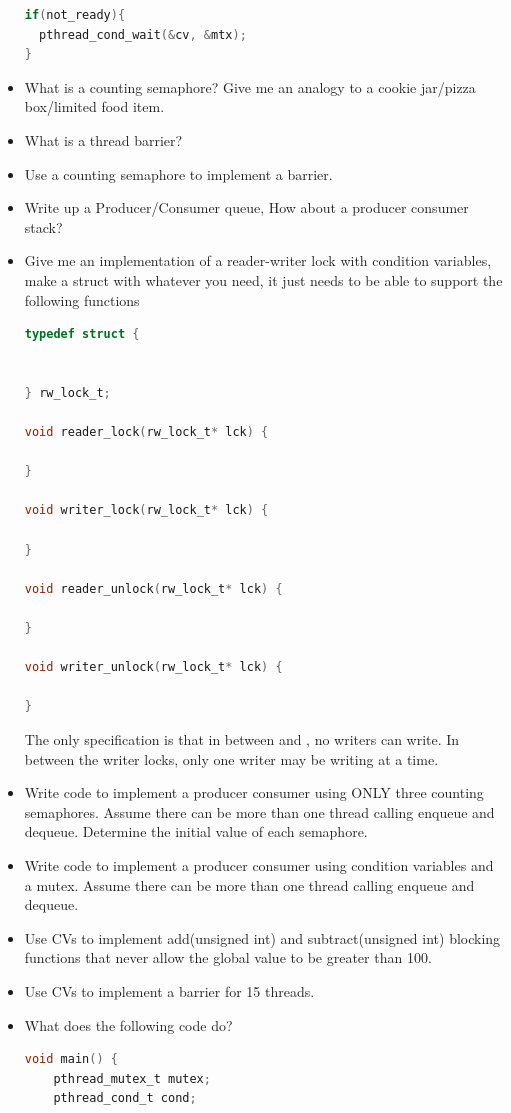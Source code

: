 \begin{itemize}
\begin{lstlisting}[language=C]
if(not_ready){
  pthread_cond_wait(&cv, &mtx);
}
\end{lstlisting}

\item
  What is a counting semaphore? Give me an analogy to a cookie jar/pizza box/limited food item.
\item
  What is a thread barrier?
\item
  Use a counting semaphore to implement a barrier.
\item
  Write up a Producer/Consumer queue, How about a producer consumer stack?
\item
  Give me an implementation of a reader-writer lock with condition variables, make a struct with whatever you need, it just needs to be able to support the following functions

\begin{lstlisting}[language=C]
typedef struct {


} rw_lock_t;

void reader_lock(rw_lock_t* lck) {

}

void writer_lock(rw_lock_t* lck) {

}

void reader_unlock(rw_lock_t* lck) {

}

void writer_unlock(rw_lock_t* lck) {

}
\end{lstlisting}

  The only specification is that in between  and , no writers can write. In between the writer locks, only one writer may be writing at a time.
\item
  Write code to implement a producer consumer using ONLY three counting semaphores. Assume there can be more than one thread calling enqueue and dequeue. Determine the initial value of each semaphore.
\item
  Write code to implement a producer consumer using condition variables and a mutex. Assume there can be more than one thread calling enqueue and dequeue.
\item
  Use CVs to implement add(unsigned int) and subtract(unsigned int) blocking functions that never allow the global value to be greater than 100.
\item
  Use CVs to implement a barrier for 15 threads.
\item
  What does the following code do?
\begin{lstlisting}[language=C]
void main() {
    pthread_mutex_t mutex;
    pthread_cond_t cond;


\end{lstlisting}
\end{itemize}
